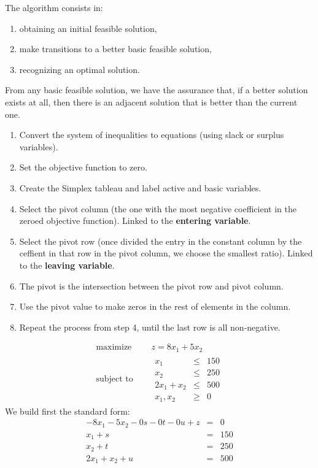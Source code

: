 The algorithm consists in:
\begin{enumerate}
  \item obtaining an initial feasible
solution,
\item make transitions to a better basic feasible solution,
\item recognizing an optimal solution.
\end{enumerate}
From any basic feasible solution, we have the assurance
that, if a better solution exists at all, then there is an adjacent solution that is better than the
current one.\cite{carter_operations_2019}

\begin{enumerate}
  \item Convert the system of inequalities to equations (using slack or surplus variables).
  \item Set the objective function to zero.
  \item Create the Simplex tableau and label active and basic variables.
  \item Select the pivot column (the one with the most negative coefficient in the zeroed objective function). Linked to the {\bf entering variable}.
  \item Select the pivot row (once divided the entry in the constant column by the ceffient in that row in the pivot column, we choose the smallest ratio). Linked to the {\bf leaving variable}.
  \item The pivot is the intersection between the pivot row and pivot column.
  \item Use the pivot value to make zeros in the rest of elements in the column.
  \item Repeat the process from step 4, until the last row is all non-negative.
\end{enumerate}




  \begin{equation*}
    \begin{aligned}
      \text{maximize } \quad & z = 8x_1+5x_2 \\
      \text{subject to }\quad &
      \begin{array}{rcl}
        x_1 &\leq &150 \\
        x_2 &\leq &250 \\
        2x_1+x_2 &\leq &500 \\
        x_1,x_2 &\geq& 0
      \end{array}
    \end{aligned}
  \end{equation*}
We build first the standard form:
\begin{eqnarray*}
  -8x_1-5x_2-0s-0t-0u+z&=&0\\
  x_1+s&=&150\\
  x_2+t&=&250\\
  2x_1+x_2+u&=&500
\end{eqnarray*}

